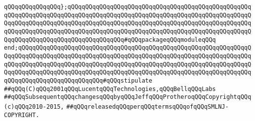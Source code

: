 \verb|qQQqqQQqqQQqqQQq};qQQqqQQqqQQqqQQqqQQqqQQqqQQqqQQqqQQqqQQqqQQqqQQqqQQqqQQqqQQqqQQqqQQqqQQqqQQqqQQqqQQqqQQqqQQqqQQqqQQqqQQqqQQqqQQqqQQqqQQqqQQqqQQqqQQqqQQqqQQqqQQqqQQqqQQqqQQqqQQqqQQqqQQqqQQqqQQqqQQqqQQqqQQqqQQqqQQqqQQqqQQqqQQqqQQqqQQqqQQqqQQqqQQqqQQqqQQqqQQqqQQqqQQqqQQqqQQqqQQqqQQqqQQqqQQqqQQqqQQqqQQqqQQqqQQqqQQq#qQQqpackageqQQqmoduleqQQq|\newline
\verb|end;qQQqqQQqqQQqqQQqqQQqqQQqqQQqqQQqqQQqqQQqqQQqqQQqqQQqqQQqqQQqqQQqqQQqqQQqqQQqqQQqqQQqqQQqqQQqqQQqqQQqqQQqqQQqqQQqqQQqqQQqqQQqqQQqqQQqqQQqqQQqqQQqqQQqqQQqqQQqqQQqqQQqqQQqqQQqqQQqqQQqqQQqqQQqqQQqqQQqqQQqqQQqqQQqqQQqqQQqqQQqqQQqqQQqqQQqqQQqqQQqqQQqqQQqqQQqqQQqqQQqqQQqqQQqqQQqqQQqqQQqqQQqqQQqqQQqqQQqqQQqqQQq#qQQqstipulate|\newline
\newline
\verb|##qQQq(C)qQQq2001qQQqLucentqQQqTechnologies,qQQqBellqQQqLabs|\newline
\verb|##qQQqSubsequentqQQqchangesqQQqbyqQQqJeffqQQqProtheroqQQqCopyrightqQQq(c)qQQq2010-2015,|\newline
\verb|##qQQqreleasedqQQqperqQQqtermsqQQqofqQQqSMLNJ-COPYRIGHT.|\newline
\newline

